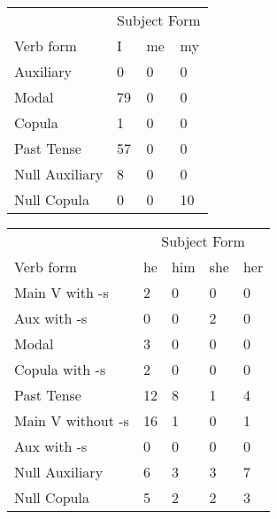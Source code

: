 \begin{table}[]
    \begin{minipage}{0.5\textwidth}
    \centering
    \begin{tabular}{@{}llll@{}}
        \toprule
            &\multicolumn{3}{c}{Subject Form}\\
            \cline{2-4}
        Verb form & I & me & my \\
        \midrule
        Auxiliary & 0 & 0 & 0 \\
        Modal & 79 & 0 & 0 \\
        Copula & 1 & 0 & 0 \\
        Past Tense & 57 & 0 & 0 \\
        \hline
        Null Auxiliary & 8 & 0 & 0 \\
        Null Copula & 0 & 0 & 10 \\
        \bottomrule
    \end{tabular}
\end{minipage}
\begin{minipage}{0.5\textwidth}
    \centering
    \begin{tabular}{@{}lllll@{}}
        \toprule
            &\multicolumn{4}{c}{Subject Form}\\
            \cline{2-5}
        Verb form & he & him & she & her \\
        \midrule
        Main V with -s & 2 & 0 & 0 & 0 \\
        Aux with -s & 0 & 0 & 2 & 0 \\
        Modal & 3 & 0 & 0 & 0 \\
        Copula with -s & 2 & 0 & 0 & 0 \\
        Past Tense & 12 & 8 & 1 & 4 \\
        \hline
        Main V without -s & 16 & 1 & 0 & 1 \\
        Aux with -s & 0 & 0 & 0 & 0 \\
        Null Auxiliary & 6 & 3 & 3 & 7 \\
        Null Copula & 5 & 2 & 2 & 3 \\
        \bottomrule
    \end{tabular}
\end{minipage}
\end{table}

